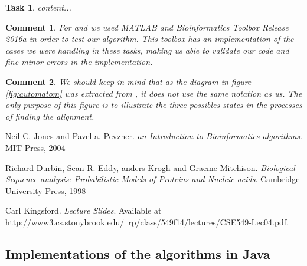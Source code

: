 \documentclass[11pt]{article} %
\theoremstyle{problemstyle}
\newtheorem{exercise}{Task}	%
\theoremstyle{problemstyle}
\newtheorem{commental}{Comment}
\begin{document}
\begin{exercise} %
	content...
\end{exercise}

\begin{commental}
For  and  we used MATLAB and Bioinformatics Toolbox Release 2016a in order to test our algorithm. This toolbox has an implementation of the cases we were handling in these tasks, making us able to validate our code and fine minor errors in the implementation.
\end{commental}

\begin{commental} 
We should keep in mind that as the diagram in figure \ref{fig:automatom} was extracted from \cite{durbin}, it does not use the same notation as us. The only purpose of this figure is to illustrate the three possibles states in the processes of finding the alignment.
\end{commental}

\begin{thebibliography}{3}
	
	Neil C. Jones and Pavel a. Pevzner. 
	\textit{an Introduction to Bioinformatics algorithms}. 
	MIT Press, 2004
	
	Richard Durbin, Sean R. Eddy, anders Krogh and Graeme Mitchison. 
	\textit{Biological Sequence analysis: Probabilistic Models of Proteins and Nucleic acids}. 
	Cambridge University Press, 1998
	
	 Carl Kingsford. 
	\textit{Lecture Slides}. 
	 Available at \\ http://www3.cs.stonybrook.edu/~rp/class/549f14/lectures/CSE549-Lec04.pdf.
	
\end{thebibliography}

\newpage
\begin{appendices}
	\section{Implementations of the algorithms in Java} \label{app:alg}





\end{appendices}
\end{document}
